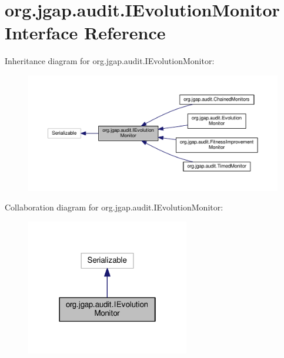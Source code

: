 \hypertarget{interfaceorg_1_1jgap_1_1audit_1_1_i_evolution_monitor}{\section{org.\-jgap.\-audit.\-I\-Evolution\-Monitor Interface Reference}
\label{interfaceorg_1_1jgap_1_1audit_1_1_i_evolution_monitor}
}


Inheritance diagram for org.\-jgap.\-audit.\-I\-Evolution\-Monitor\-:
\nopagebreak
\begin{figure}[H]
\begin{center}
\leavevmode
\includegraphics[width=350pt]{interfaceorg_1_1jgap_1_1audit_1_1_i_evolution_monitor__inherit__graph}
\end{center}
\end{figure}


Collaboration diagram for org.\-jgap.\-audit.\-I\-Evolution\-Monitor\-:
\nopagebreak
\begin{figure}[H]
\begin{center}
\leavevmode
\includegraphics[width=202pt]{interfaceorg_1_1jgap_1_1audit_1_1_i_evolution_monitor__coll__graph}
\end{center}
\end{figure}
